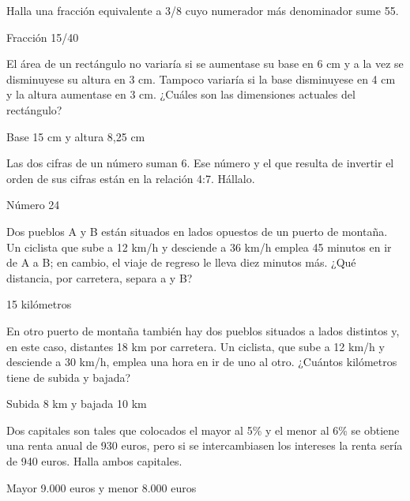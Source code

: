 \documentclass[spanish, 12pt]{exam}
\begin{document}
\begin{questions}
\question Halla una fracción equivalente a 3/8 cuyo numerador más denominador sume 55.

\begin{solution} Fracción 15/40 \end{solution}

\question El área de un rectángulo no variaría si se aumentase su base en 6 cm y a la vez se disminuyese su altura en 3 cm. Tampoco variaría si la base disminuyese en 4 cm y la altura aumentase en 3 cm. ¿Cuáles son las dimensiones actuales del rectángulo?
\begin{solution} Base 15 cm y altura 8,25 cm \end{solution}

\question Las dos cifras de un número suman 6. Ese número y el que resulta de invertir el orden de sus cifras están en la relación 4:7. Hállalo.
\begin{solution}  Número 24 \end{solution}

\question Dos pueblos A y B están situados en lados opuestos de un puerto de montaña. Un ciclista que sube a 12 km/h y desciende a 36 km/h emplea 45 minutos en ir de A a B; en cambio, el viaje de regreso le lleva diez minutos más. ¿Qué distancia, por carretera, separa a y B?
\begin{solution} 15 kilómetros \end{solution}

\question En otro puerto de montaña también hay dos pueblos situados a lados distintos y, en este caso, distantes 18 km por carretera. Un ciclista, que sube a 12 km/h y desciende a 30 km/h, emplea una hora en ir de uno al otro. ¿Cuántos kilómetros tiene de subida y bajada?

\begin{solution} Subida 8 km y bajada 10 km \end{solution}

\question Dos capitales son tales que colocados el mayor al 5\% y el menor al 6\% se obtiene una renta anual de 930 euros, pero si se intercambiasen los intereses la renta sería de 940 euros. Halla ambos capitales.
\begin{solution} Mayor 9.000 euros y menor 8.000 euros \end{solution}

\end{questions}
\end{document}
